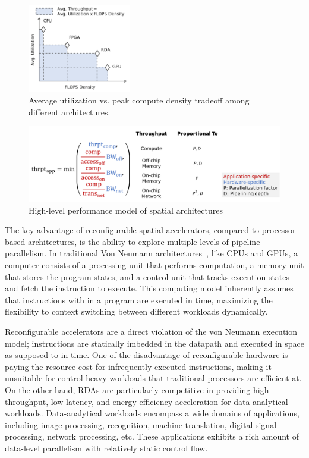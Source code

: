 \begin{figure}
\centering
\includegraphics[width=0.4\textwidth]{figs/peakutil.pdf}
\caption[Average utilization vs. peak compute density tradeoff]{
 Average utilization vs. peak compute density tradeoff among different architectures.
}
\label{fig:peakutil}
\end{figure}

\begin{figure}
\centering
\includegraphics[width=1\textwidth]{figs/perfmodel.pdf}
\caption[High-level performance model of spatial architectures]{
High-level performance model of spatial architectures
}
\label{fig:perfmodel}
\end{figure}

The key advantage of reconfigurable spatial accelerators, compared to processor-based architectures, 
is the ability to explore multiple levels of pipeline parallelism. 
In traditional Von Neumann architectures~\cite{vonneumann}, like CPUs and GPUs,
a computer consists of a processing unit that performs
computation, a memory unit that stores the program states, and a control unit that tracks execution
states and fetch the instruction to execute. This computing model inherently assumes that
instructions with in a program are executed in time, maximizing the flexibility to 
context switching between different workloads dynamically.

Reconfigurable accelerators are a direct violation of the von Neumann execution model; 
instructions are statically imbedded in the datapath and executed in space as supposed to in time.
One of the disadvantage of reconfigurable hardware is paying the resource cost for infrequently
executed instructions, making it unsuitable for control-heavy workloads that traditional
processors are efficient at.
On the other hand, RDAs are particularly competitive in providing high-throughput, 
low-latency, and energy-efficiency acceleration for data-analytical workloads.
Data-analytical workloads encompass a wide domains of applications, including image processing,
recognition, machine translation, digital signal processing, network processing, etc.
These applications exhibits a rich amount of data-level parallelism with relatively static control
flow.

